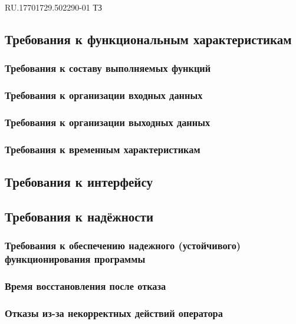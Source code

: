 \begin{uspd}{RU.17701729.502290-01 ТЗ}
    \subsection{Требования к функциональным характеристикам}

    \subsubsection{Требования к составу выполняемых функций}

    
\subsubsection{Требования к организации входных данных}

    
\subsubsection{Требования к организации выходных данных}

    
\subsubsection{Требования к временным характеристикам}

    

\subsection{Требования к интерфейсу}

    
\subsection{Требования к надёжности}

    \subsubsection{Требования к обеспечению надежного (устойчивого) функционирования программы}

    
\subsubsection{Время восстановления после отказа}

    
\subsubsection{Отказы из-за некорректных действий оператора}


\end{uspd}
